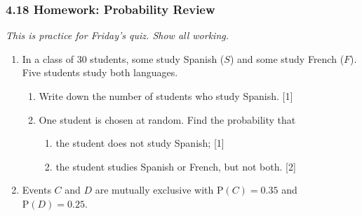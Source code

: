 \documentclass[12pt, twoside]{article}
\begin{document}
\subsubsection*{4.18 Homework: Probability Review}
\emph{This is practice for Friday's quiz. Show all working.}

\begin{enumerate}[itemsep=0.15cm]

\item In a class of 30 students, some study Spanish ($S$) and some study French ($F$).
Five students study both languages.

\begin{center}
\vspace{-0.2cm}
\vspace{-0.2cm}
\end{center}

\begin{enumerate}[itemsep=0.1cm]
  \item Write down the number of students who study Spanish. \hfill [1]
  \item One student is chosen at random. Find the probability that
  \begin{enumerate}[label=(\roman*), itemsep=0.1cm]
    \item the student does not study Spanish; \hfill [1]
    \item the student studies Spanish or French, but not both. \hfill [2]
  \end{enumerate}
\end{enumerate}


\item Events $C$ and $D$ are mutually exclusive with
$\mathrm{P}(C) = 0.35$ and $\mathrm{P}(D) = 0.25$.


\end{enumerate}
\end{document}

